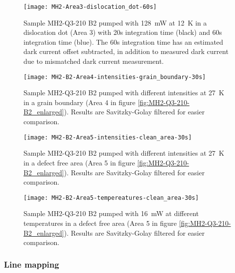 \begin{figure}[H]
\centering
\texttt{[image: MH2-Area3-dislocation\_dot-60s]}
\caption[MH2-Q3-210 at area 3]{Sample MH2-Q3-210 B2 pumped with 128~mW at 12~K in a dislocation dot (Area 3) with 20s integration time (black) and 60s integration time (blue). The 60s integration time has an estimated dark current offset subtracted, in addition to measured dark current due to mismatched dark current measurement.}
\label{fig:MH2-Area3-dislocation_dot-60s}%
\end{figure}


\begin{figure}[H]
\centering
\texttt{[image: MH2-B2-Area4-intensities-grain\_boundary-30s]}
\caption[MH2-Q3-210 at area 4 with different intensities]{Sample MH2-Q3-210 B2 pumped with different intensities at 27~K in a grain boundary (Area 4 in figure \ref{fig:MH2-Q3-210-B2_enlarged}). Results are Savitzky-Golay filtered for easier comparison.}
\label{fig:MH2-B2-Area4-intensities-grain_boundary-30s}%
\end{figure}


\begin{figure}[H]
\centering
\texttt{[image: MH2-B2-Area5-intensities-clean\_area-30s]}
\caption[MH2-Q3-210 at area 5 with different intensities]{Sample MH2-Q3-210 B2 pumped with different intensities at 27~K in a defect free area (Area 5 in figure \ref{fig:MH2-Q3-210-B2_enlarged}). Results are Savitzky-Golay filtered for easier comparison.}
\label{fig:MH2-B2-Area5-intensities-clean_area-30s}%
\end{figure}


\begin{figure}[H]
\centering
\texttt{[image: MH2-B2-Area5-tempereatures-clean\_area-30s]}
\caption[MH2-Q3-210 at area 5 with different temperatures]{Sample MH2-Q3-210 B2 pumped with 16~mW at different temperatures in a defect free area (Area 5 in figure \ref{fig:MH2-Q3-210-B2_enlarged}). Results are Savitzky-Golay filtered for easier comparison.}
\label{fig:MH2-B2-Area5-tempereatures-clean_area-30s}%
\end{figure}







\subsubsection{Line mapping}

